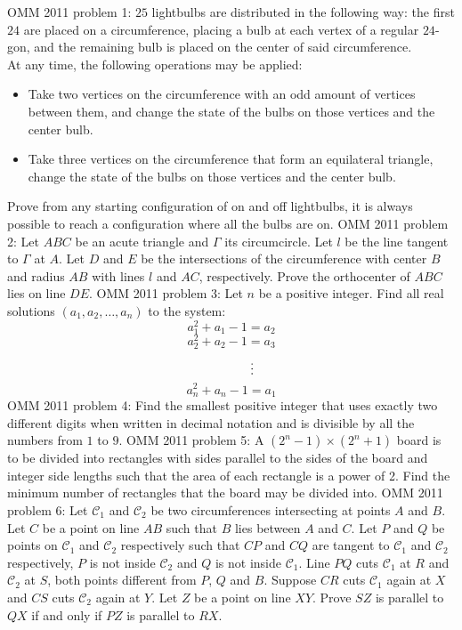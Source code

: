 OMM 2011 problem 1:  $25$ lightbulbs are distributed in the following way: the first $24$ are placed on a circumference, placing a bulb at each vertex of a regular $24$-gon, and the remaining bulb is placed on the center of said circumference. \\
At any time, the following operations may be applied:
\begin{itemize}
  \item Take two vertices on the circumference with an odd amount of vertices between them, and change the state of the bulbs on those vertices and the center bulb.
  \item Take three vertices on the circumference that form an equilateral triangle, change the state of the bulbs on those vertices and the center bulb.
\end{itemize}
Prove from any starting configuration of on and off lightbulbs, it is always possible to reach a configuration where all the bulbs are on. 
OMM 2011 problem 2:  Let $ABC$ be an acute triangle and $\Gamma$ its circumcircle. Let $l$ be the line tangent to $\Gamma$ at $A$. Let $D$ and $E$ be the intersections of the circumference with center $B$ and radius $AB$ with lines $l$ and $AC$, respectively. Prove the orthocenter of $ABC$ lies on line $DE$. 
OMM 2011 problem 3:  Let $n$ be a positive integer. Find all real solutions $(a_1, a_2, \dots, a_n)$ to the system:
\[ a_1^2 + a_1 - 1 = a_2 \]
\[ a_2^2 + a_2 - 1 = a_3 \]
\[ \hspace*{3.3em} \vdots \]
\[ a_n^2 + a_n - 1 = a_1 \] 
OMM 2011 problem 4:  Find the smallest positive integer that uses exactly two different digits when written in decimal notation and is divisible by all the numbers from $1$ to $9$. 
OMM 2011 problem 5:  A $(2^n - 1) \times (2^n +1)$ board is to be divided into rectangles with sides parallel to the sides of the board and integer side lengths such that the area of each rectangle is a power of 2. Find the minimum number of rectangles that the board may be divided into. 
OMM 2011 problem 6:  Let $\mathcal{C}_1$ and $\mathcal{C}_2$ be two circumferences intersecting at points $A$ and $B$. Let $C$ be a point on line $AB$ such that $B$ lies between $A$ and $C$. Let $P$ and $Q$ be points on $\mathcal{C}_1$ and $\mathcal{C}_2$ respectively such that $CP$ and $CQ$ are tangent to $\mathcal{C}_1$ and $\mathcal{C}_2$ respectively, $P$ is not inside $\mathcal{C}_2$ and $Q$ is not inside $\mathcal{C}_1$. Line $PQ$ cuts $\mathcal{C}_1$ at $R$ and $\mathcal{C}_2$ at $S$, both points different from $P$, $Q$ and $B$. Suppose $CR$ cuts $\mathcal{C}_1$ again at $X$ and $CS$ cuts $\mathcal{C}_2$ again at $Y$. Let $Z$ be a point on line $XY$. Prove $SZ$ is parallel to $QX$ if and only if $PZ$ is parallel to $RX$. 

